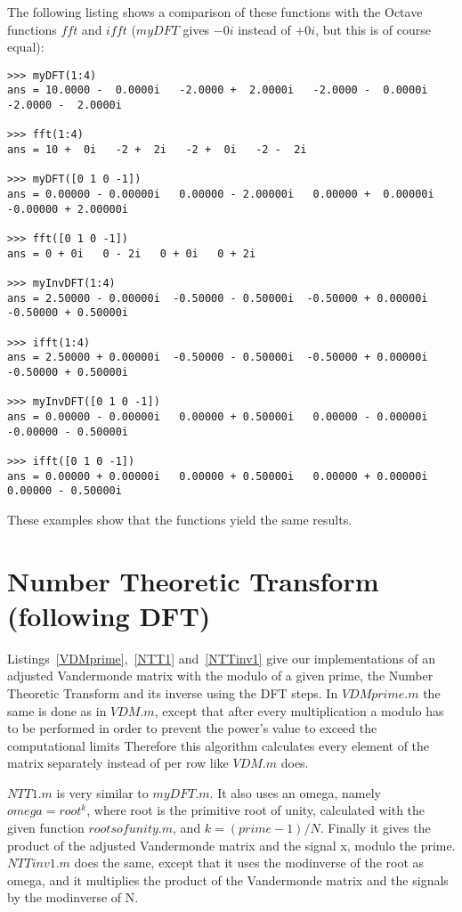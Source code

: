 \documentclass{article}
\begin{document}
The following listing shows a comparison of these functions with the Octave functions $fft$ and $ifft$ ($myDFT$ gives $-0i$ instead of $+0i$, but this is of course equal):

\begin{lstlisting}
>>> myDFT(1:4)
ans = 10.0000 -  0.0000i   -2.0000 +  2.0000i   -2.0000 -  0.0000i   -2.0000 -  2.0000i

>>> fft(1:4)
ans = 10 +  0i   -2 +  2i   -2 +  0i   -2 -  2i

>>> myDFT([0 1 0 -1])
ans = 0.00000 - 0.00000i   0.00000 - 2.00000i   0.00000 +  0.00000i   -0.00000 + 2.00000i

>>> fft([0 1 0 -1])
ans = 0 + 0i   0 - 2i   0 + 0i   0 + 2i

>>> myInvDFT(1:4)
ans = 2.50000 - 0.00000i  -0.50000 - 0.50000i  -0.50000 + 0.00000i   -0.50000 + 0.50000i

>>> ifft(1:4)
ans = 2.50000 + 0.00000i  -0.50000 - 0.50000i  -0.50000 + 0.00000i   -0.50000 + 0.50000i

>>> myInvDFT([0 1 0 -1])
ans = 0.00000 - 0.00000i   0.00000 + 0.50000i   0.00000 - 0.00000i   -0.00000 - 0.50000i

>>> ifft([0 1 0 -1])
ans = 0.00000 + 0.00000i   0.00000 + 0.50000i   0.00000 + 0.00000i    0.00000 - 0.50000i
\end{lstlisting}
These examples show that the functions yield the same results.

 
 
 

\section{Number Theoretic Transform (following DFT)}
Listings~\ref{VDMprime},~\ref{NTT1} and~\ref{NTTinv1} give our implementations of
an adjusted Vandermonde matrix with the modulo of a given prime,
the Number Theoretic Transform and its inverse using the DFT steps.
In $VDMprime.m$ the same is done as in $VDM.m$,
except that after every multiplication a modulo has to be performed
in order to prevent the power's value to exceed the computational limits
Therefore this algorithm calculates every element of the matrix separately instead of per row like $VDM.m$ does.

$NTT1.m$ is very similar to $myDFT.m$.
 It also uses an omega, namely $omega = root^k$,
 where root is the primitive root of unity,
 calculated with the given function $rootsofunity.m$, and $k = (prime - 1)/N$.
 Finally it gives the product of the adjusted Vandermonde matrix and the signal x, modulo the prime.
 $NTTinv1.m$ does the same, except that it uses the modinverse of the root as omega,
and it multiplies the product of the Vandermonde matrix and the signals by the modinverse of N.
\end{document}
